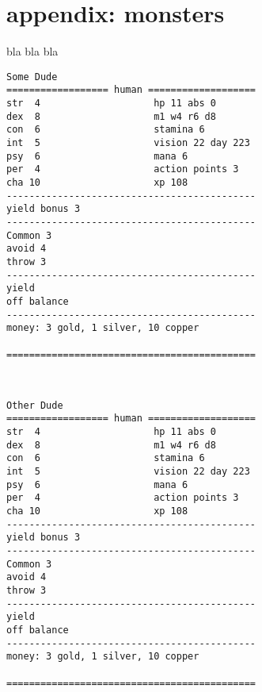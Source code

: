 \newpage
\section*{appendix: monsters}

\raggedbottom

bla bla bla


\goodbreak \small \begin{samepage} \begin{verbatim}
Some Dude
================== human ===================
str  4                    hp 11 abs 0
dex  8                    m1 w4 r6 d8
con  6                    stamina 6
int  5                    vision 22 day 223
psy  6                    mana 6
per  4                    action points 3
cha 10                    xp 108
--------------------------------------------
yield bonus 3
--------------------------------------------
Common 3
avoid 4
throw 3
--------------------------------------------
yield
off balance
--------------------------------------------
money: 3 gold, 1 silver, 10 copper

============================================
\end{verbatim} \end{samepage} \normalsize

\

\goodbreak \small \begin{samepage} \begin{verbatim}
Other Dude
================== human ===================
str  4                    hp 11 abs 0
dex  8                    m1 w4 r6 d8
con  6                    stamina 6
int  5                    vision 22 day 223
psy  6                    mana 6
per  4                    action points 3
cha 10                    xp 108
--------------------------------------------
yield bonus 3
--------------------------------------------
Common 3
avoid 4
throw 3
--------------------------------------------
yield
off balance
--------------------------------------------
money: 3 gold, 1 silver, 10 copper

============================================
\end{verbatim} \end{samepage} \normalsize

